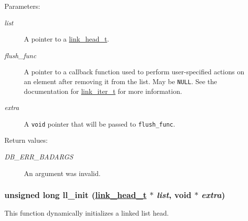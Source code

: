 \begin{Desc}
\item[Parameters:]
\begin{description}
\item[{\em list}]A pointer to a \hyperlink{group__dbprim__link_a0}{link\_\-head\_\-t}. \item[{\em flush\_\-func}]A pointer to a callback function used to perform user-specified actions on an element after removing it from the list. May be {\tt NULL}. See the documentation for \hyperlink{group__dbprim__link_a2}{link\_\-iter\_\-t} for more information. \item[{\em extra}]A {\tt void} pointer that will be passed to {\tt flush\_\-func}.\end{description}
\end{Desc}
\begin{Desc}
\item[Return values:]
\begin{description}
\item[{\em DB\_\-ERR\_\-BADARGS}]An argument was invalid. \end{description}
\end{Desc}
\hypertarget{group__dbprim__link_a5}{
\subsubsection[ll\_\-init]{\setlength{\rightskip}{0pt plus 5cm}unsigned long ll\_\-init (\hyperlink{dbprim_8h_a0}{link\_\-head\_\-t} $\ast$ {\em list}, void $\ast$ {\em extra})}}
\label{group__dbprim__link_a5}


This function dynamically initializes a linked list head.


